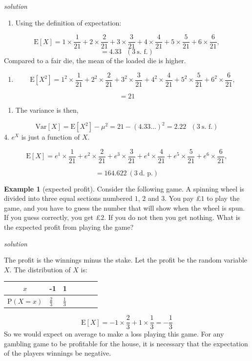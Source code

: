 \documentclass[
]{book}
\providecommand{\tightlist}{%
  \setlength{\itemsep}{0pt}\setlength{\parskip}{0pt}}
\theoremstyle{definition}
\theoremstyle{definition}
\newtheorem{example}{Example}[chapter]
\theoremstyle{definition}
\theoremstyle{definition}
\theoremstyle{remark}
\begin{document}
\emph{solution}

\begin{enumerate}
\def\labelenumi{\alph{enumi})}
\tightlist
\item
  Using the definition of expectation:
\end{enumerate}

\[ \text{E}[X] = 1\times \frac{1}{21}+2\times \frac{2}{21}+3\times \frac{3}{21}+4\times \frac{4}{21}+5\times \frac{5}{21}+6\times \frac{6}{21},\]
\[ = 4.33 \ \ \ (3 \ \text{s. f.})\]
Compared to a fair die, the mean of the loaded die is higher.

\begin{enumerate}
\def\labelenumi{\alph{enumi})}
\setcounter{enumi}{1}
\tightlist
\item
  \[ \text{E}[X^2] = 1^2\times \frac{1}{21}+2^2\times \frac{2}{21}+3^2\times \frac{3}{21}+4^2\times \frac{4}{21}+5^2\times \frac{5}{21}+6^2\times \frac{6}{21},\]
\end{enumerate}

\[ = 21\]

\begin{enumerate}
\def\labelenumi{\arabic{enumi}.}
\setcounter{enumi}{2}
\tightlist
\item
  The variance is then,
\end{enumerate}

\[\text{Var}[X]=\text{E}[X^2]-\mu^2 = 21-(4.33\dots)^2= 2.22 \ \ \ (3 \ \text{s. f.})\]
4. \(e^X\) is just a function of \(X\).

\[ \text{E}[X] = e^1\times \frac{1}{21}+e^2\times \frac{2}{21}+e^3\times \frac{3}{21}+e^4\times \frac{4}{21}+e^5\times \frac{5}{21}+e^6\times \frac{6}{21},\]

\[ = 164.622 \ (3 \ \text{d. p.}) \]

\begin{example}[expected profit]
Consider the following game. A spinning wheel is divided into three equal sections numbered \(1\), \(2\) and \(3\). You pay £\(1\) to play the game, and you have to guess the number that will show when the wheel is spun. If you guess correctly, you get £\(2\). If you do not then you get nothing. What is the expected profit from playing the game?

\emph{solution}

The profit is the winnings minus the stake. Let the profit be the random variable \(X\). The distribution of \(X\) is:

\begin{longtable}[]{@{}cllllll@{}}
\toprule
\(x\) & -1 & 1 & & & &\tabularnewline
\midrule
\endhead
\(\text{P}(X=x)\) & \(\frac{2}{3}\) & \(\frac{1}{3}\) & & & &\tabularnewline
\bottomrule
\end{longtable}

\[\text{E}[X] = -1 \times \frac{2}{3} + 1 \times \frac{1}{3} = -\frac{1}{3}\]
So we would expect on average to make a loss playing this game. For any gambling game to be profitable for the house, it is necessary that the expectation of the players winnings be negative.
\end{example}
\end{document}
